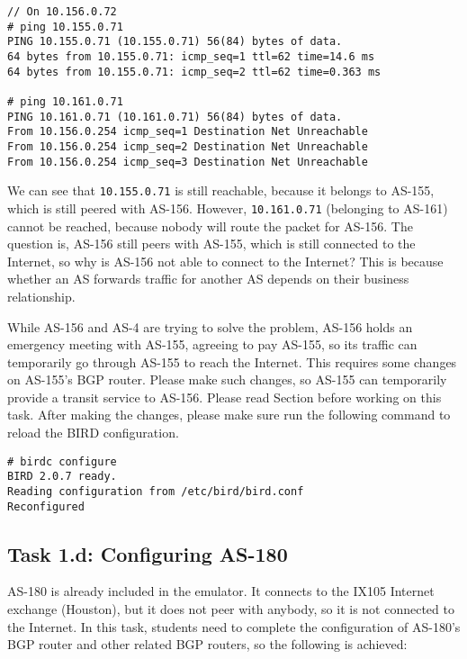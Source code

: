 \begin{lstlisting}
// On 10.156.0.72
# ping 10.155.0.71
PING 10.155.0.71 (10.155.0.71) 56(84) bytes of data.
64 bytes from 10.155.0.71: icmp_seq=1 ttl=62 time=14.6 ms
64 bytes from 10.155.0.71: icmp_seq=2 ttl=62 time=0.363 ms

# ping 10.161.0.71
PING 10.161.0.71 (10.161.0.71) 56(84) bytes of data.
From 10.156.0.254 icmp_seq=1 Destination Net Unreachable
From 10.156.0.254 icmp_seq=2 Destination Net Unreachable
From 10.156.0.254 icmp_seq=3 Destination Net Unreachable
\end{lstlisting}
 
We can see that \texttt{10.155.0.71} is still reachable, because it
belongs to AS-155, which is still peered with AS-156. However,
\texttt{10.161.0.71} (belonging to AS-161) cannot be reached, because 
nobody will route the packet for AS-156.
The question is, AS-156 still peers with AS-155, 
which is still connected to the Internet, so why is AS-156 not able to 
connect to the Internet?  This is because whether an AS forwards 
traffic for another AS depends on their business relationship. 


While AS-156 and AS-4 are trying to solve the problem, AS-156 holds an 
emergency meeting with AS-155, agreeing to pay AS-155, so its 
traffic can temporarily go through AS-155 to reach the Internet. 
This requires some changes on AS-155's BGP router. 
Please make such changes, so AS-155 can temporarily 
provide a transit service to AS-156.
Please read Section \bigcommunity before working on this task. 
After making the changes, please make sure run the following 
command to reload the BIRD configuration.

\begin{lstlisting}
# birdc configure
BIRD 2.0.7 ready.
Reading configuration from /etc/bird/bird.conf
Reconfigured
\end{lstlisting}
 

 
\subsection{Task 1.d: Configuring AS-180} 

AS-180 is already included in the emulator. It connects to the
IX105 Internet exchange (Houston), but it does not peer with anybody, 
so it is not connected to the Internet. 
In this task, students need to complete the configuration of 
AS-180's BGP router and other related BGP routers, 
so the following is achieved:

